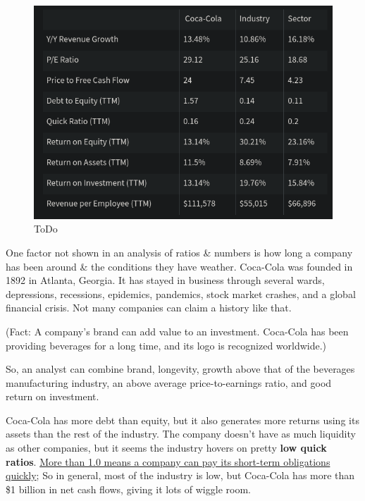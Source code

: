 \documentclass{article}
\begin{document}
	\begin{figure}[H]
		\includegraphics[width=\linewidth]{InvestingPics/figure2.png}
		\caption{ToDo}
		\label{ToDo}
	\end{figure}

	One factor not shown in an analysis of ratios \& numbers is how long a company has been around \& the conditions they have weather. Coca-Cola was founded in 1892 in Atlanta, Georgia. It has stayed
	in business through several wards, depressions, recessions, epidemics, pandemics, stock market crashes, and a global financial crisis. Not many companies can claim a history like that. \newline \newline

	(Fact: A company's brand can add value to an investment. Coca-Cola has been providing beverages for a long time, and its logo is recognized worldwide.) \newline \newline

	So, an analyst can combine brand, longevity, growth above that of the beverages manufacturing industry, an above average price-to-earnings ratio, and good return on investment. \newline \newline

	Coca-Cola has more debt than equity, but it also generates more returns using its assets than the rest of the industry. The company doesn't have as much liquidity as other companies, but it seems
	the industry hovers on pretty {\bf low quick ratios}. \underline{More than 1.0 means a company can pay its short-term obligations quickly}; So in general, most of the industry is low, but Coca-Cola 
	has more than \$1 billion in net cash flows, giving it lots of wiggle room. \newline \newline
\end{document}
